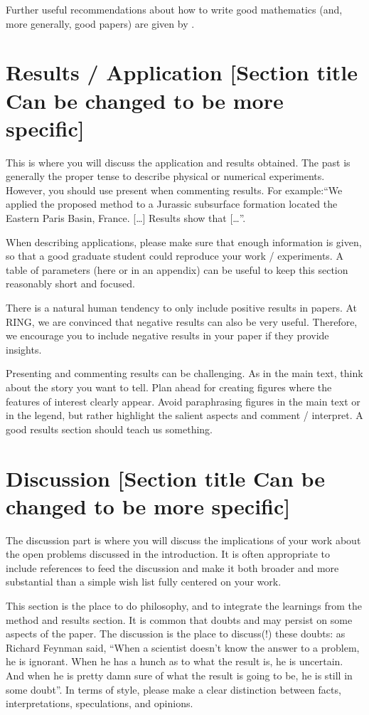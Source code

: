 \documentclass[final]{ring}
\begin{document}
Further useful recommendations about how to write good mathematics (and, more generally, good papers) are given by \citet{Lee2010}.


\section{Results / Application [Section title Can be changed to be more specific]}
\label{sec:appli}

This is where you will discuss the application and results obtained. The past is generally the proper tense to describe physical or numerical experiments. However, you should use present when commenting results. For example:``We applied the proposed method to a Jurassic subsurface formation located the Eastern Paris Basin, France. […] Results show that […''.

When describing applications, please make sure that enough information is given, so that a good graduate student could reproduce your work / experiments. A table of parameters (here or in an appendix) can be useful to keep this section reasonably short and focused.

There is a natural human tendency to only include positive results in papers. At RING, we are convinced that negative results can also be very useful. Therefore, we encourage you to include negative results in your paper if they provide insights. 

Presenting and commenting results can be challenging. As in the main text, think about the story you want to tell. Plan ahead for creating figures where the features of interest clearly appear. Avoid paraphrasing figures in the main text or in the legend, but rather highlight the salient aspects and comment / interpret. A good results section should teach us something. 


\section{Discussion [Section title Can be changed to be more specific]}
\label{sec:discussion}

The discussion part is where you will discuss the implications of your work about the open problems discussed in the introduction. It is often appropriate to include references to feed the discussion and make it both broader and more substantial than a simple wish list fully centered on your work. 

This section is the place to do philosophy, and to integrate the learnings from the method and results section. It is common that doubts and may persist on some aspects of the paper. The discussion is the place to discuss(!) these doubts: as Richard Feynman said, ``When a scientist doesn't know the answer to a problem, he is ignorant. When he has a hunch as to what the result is, he is uncertain. And when he is pretty damn sure of what the result is going to be, he is still in some doubt''. In terms of style, please make a clear distinction between facts, interpretations, speculations, and opinions. 
\end{document}
